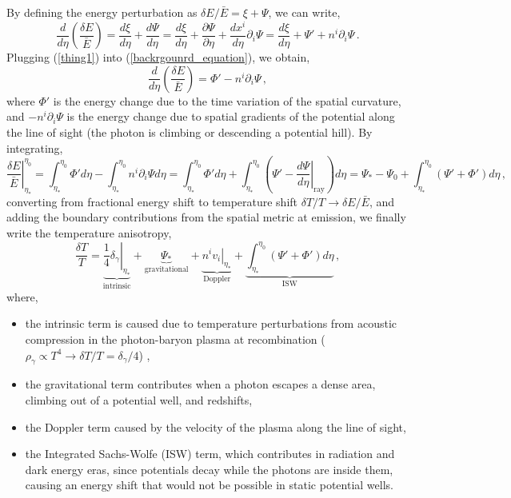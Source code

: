 \documentclass{book}
\begin{document}
	By defining the energy perturbation as $\delta E/\bar E = \xi+\Psi$, we can write,
	\begin{equation}
		\label{thing1}
		\frac{d}{d\eta}\left( \frac{\delta E}{\bar E} \right) = \frac{d\xi}{d\eta}+\frac{d\Psi}{d\eta}=\frac{d\xi}{d\eta}+\frac{\partial \Psi}{\partial \eta}+ \frac{d x^i}{d\eta} \partial_i \Psi = \frac{d\xi}{d\eta} + \Psi' + n^i\partial_i\Psi \, .
	\end{equation}
	Plugging (\ref{thing1}) into (\ref{backrgounrd_equation}), we obtain,
	\begin{equation}
		\frac{d}{d\eta}\left( \frac{\delta E}{\bar E} \right) = \Phi'-n^i \partial_i \Psi \, ,
	\end{equation}
	where $\Phi'$ is the energy change due to the time variation of the spatial curvature, and $-n^i\partial_i \Psi$ is the energy change due to spatial gradients of the potential along the line of sight (the photon is climbing or descending a potential hill). By integrating, 
	\begin{equation}
		\left.  \frac{\delta E}{\bar E} \right|^{\eta_0}_{\eta_*}=\int^{\eta_0}_{\eta_*} \Phi' d\eta - \int^{\eta_0}_{\eta_*} n^i\partial_i\Psi d\eta=\int^{\eta_0}_{\eta_*} \Phi' d\eta + \int^{\eta_0}_{\eta_*} \left( \Psi'-\left. \frac{d\Psi}{d\eta} \right|_\text{ray} \right)d\eta=\Psi_* - \Psi_0 +  \int^{\eta_0}_{\eta_*} \left( \Psi'+\Phi' \right) d\eta \, ,
	\end{equation}
	converting from fractional energy shift to temperature shift $\delta T/T\to \delta E/\bar E$, and adding the boundary contributions from the spatial metric at emission, we finally write the temperature anisotropy,
	\begin{equation}
		\frac{\delta T}{T}= \underbrace{\left. \frac14 \delta_\gamma \right|_{\eta_*}}_\text{intrinsic} + \underbrace{\Psi_*}_\text{gravitational}+\underbrace{\left. n^i v_i \right|_{\eta_*}}_\text{Doppler}+\underbrace{\int_{\eta_*}^{\eta_0}(\Psi'+\Phi')d\eta}_\text{ISW} \, ,
	\end{equation}
	where,
	\begin{itemize}
		\item the intrinsic term is caused due to temperature perturbations from acoustic compression in the photon-baryon plasma at recombination ($\rho_\gamma \propto T^4 \to \delta T/T=\delta_\gamma /4 $) ,
		\item the gravitational term contributes when a photon escapes a dense area, climbing out of a potential well, and redshifts,
		\item the Doppler term caused by the velocity of the plasma along the line of sight,
		\item the Integrated Sachs-Wolfe (ISW) term, which contributes in radiation and dark energy eras, since potentials decay while the photons are inside them, causing an energy shift that would not be possible in static potential wells.
	\end{itemize}
\end{document}
